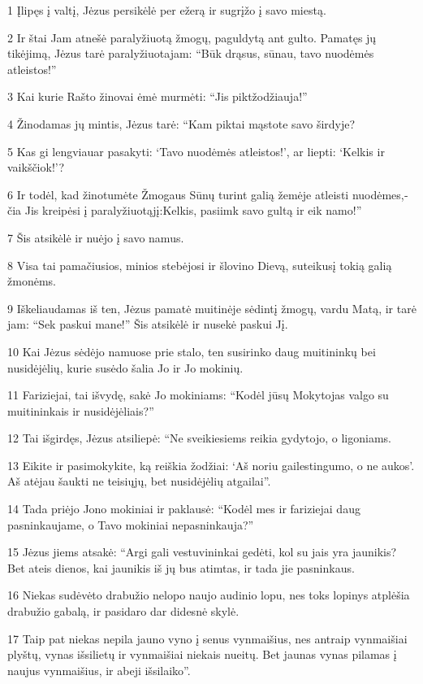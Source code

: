 \par 1 Įlipęs į valtį, Jėzus persikėlė per ežerą ir sugrįžo į savo miestą. 
\par 2 Ir štai Jam atnešė paralyžiuotą žmogų, paguldytą ant gulto. Pamatęs jų tikėjimą, Jėzus tarė paralyžiuotajam: “Būk drąsus, sūnau, tavo nuodėmės atleistos!” 
\par 3 Kai kurie Rašto žinovai ėmė murmėti: “Jis piktžodžiauja!” 
\par 4 Žinodamas jų mintis, Jėzus tarė: “Kam piktai mąstote savo širdyje? 
\par 5 Kas gi lengviau­ar pasakyti: ‘Tavo nuodėmės atleistos!’, ar liepti: ‘Kelkis ir vaikščiok!’? 
\par 6 Ir todėl, kad žinotumėte Žmogaus Sūnų turint galią žemėje atleisti nuodėmes,­čia Jis kreipėsi į paralyžiuotąjį:­Kelkis, pasiimk savo gultą ir eik namo!” 
\par 7 Šis atsikėlė ir nuėjo į savo namus. 
\par 8 Visa tai pamačiusios, minios stebėjosi ir šlovino Dievą, suteikusį tokią galią žmonėms. 
\par 9 Iškeliaudamas iš ten, Jėzus pamatė muitinėje sėdintį žmogų, vardu Matą, ir tarė jam: “Sek paskui mane!” Šis atsikėlė ir nusekė paskui Jį. 
\par 10 Kai Jėzus sėdėjo namuose prie stalo, ten susirinko daug muitininkų bei nusidėjėlių, kurie susėdo šalia Jo ir Jo mokinių. 
\par 11 Fariziejai, tai išvydę, sakė Jo mokiniams: “Kodėl jūsų Mokytojas valgo su muitininkais ir nusidėjėliais?” 
\par 12 Tai išgirdęs, Jėzus atsiliepė: “Ne sveikiesiems reikia gydytojo, o ligoniams. 
\par 13 Eikite ir pasimokykite, ką reiškia žodžiai: ‘Aš noriu gailestingumo, o ne aukos’. Aš atėjau šaukti ne teisiųjų, bet nusidėjėlių atgailai”. 
\par 14 Tada priėjo Jono mokiniai ir paklausė: “Kodėl mes ir fariziejai daug pasninkaujame, o Tavo mokiniai nepasninkauja?” 
\par 15 Jėzus jiems atsakė: “Argi gali vestuvininkai gedėti, kol su jais yra jaunikis? Bet ateis dienos, kai jaunikis iš jų bus atimtas, ir tada jie pasninkaus. 
\par 16 Niekas sudėvėto drabužio nelopo naujo audinio lopu, nes toks lopinys atplėšia drabužio gabalą, ir pasidaro dar didesnė skylė. 
\par 17 Taip pat niekas nepila jauno vyno į senus vynmaišius, nes antraip vynmaišiai plyštų, vynas išsilietų ir vynmaišiai niekais nueitų. Bet jaunas vynas pilamas į naujus vynmaišius, ir abeji išsilaiko”. 
